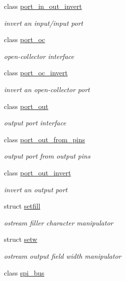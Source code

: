 \begin{DoxyCompactItemize}
class \hyperlink{classhwlib_1_1port__in__out__invert}{port\+\_\+in\+\_\+out\+\_\+invert}
\begin{DoxyCompactList}\small\item\em invert an input/input port \end{DoxyCompactList}\item 
class \hyperlink{classhwlib_1_1port__oc}{port\+\_\+oc}
\begin{DoxyCompactList}\small\item\em open-\/collector interface \end{DoxyCompactList}\item 
class \hyperlink{classhwlib_1_1port__oc__invert}{port\+\_\+oc\+\_\+invert}
\begin{DoxyCompactList}\small\item\em invert an open-\/collector port \end{DoxyCompactList}\item 
class \hyperlink{classhwlib_1_1port__out}{port\+\_\+out}
\begin{DoxyCompactList}\small\item\em output port interface \end{DoxyCompactList}\item 
class \hyperlink{classhwlib_1_1port__out__from__pins}{port\+\_\+out\+\_\+from\+\_\+pins}
\begin{DoxyCompactList}\small\item\em output port from output pins \end{DoxyCompactList}\item 
class \hyperlink{classhwlib_1_1port__out__invert}{port\+\_\+out\+\_\+invert}
\begin{DoxyCompactList}\small\item\em invert an output port \end{DoxyCompactList}\item 
struct \hyperlink{structhwlib_1_1setfill}{setfill}
\begin{DoxyCompactList}\small\item\em ostream filler character manipulator \end{DoxyCompactList}\item 
struct \hyperlink{structhwlib_1_1setw}{setw}
\begin{DoxyCompactList}\small\item\em ostream output field width manipulator \end{DoxyCompactList}\item 
class \hyperlink{classhwlib_1_1spi__bus}{spi\+\_\+bus}

\end{DoxyCompactItemize}
